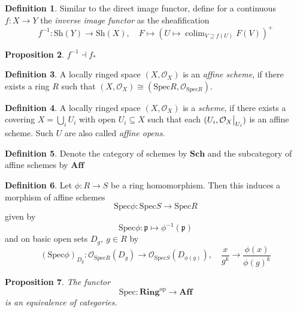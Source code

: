 \documentclass{scrartcl}
\newcommand{\p}{\mathfrak{p}}
\newcommand{\Aff}{\mathrm{\textbf{Aff}}}
\newcommand{\Sch}{\mathrm{\textbf{Sch}}}
\newcommand{\Ring}{\mathrm{\textbf{Ring}}}
\newcommand{\Spec}{\mathrm{Spec}}
\renewcommand{\O}{\mathcal{O}}
\DeclareMathOperator*{\colim}{colim}
\newcommand\restr[2]{{
    \left.\kern-\nulldelimiterspace
    #1
    \vphantom{\big|}
    \right|_{#2}
}}
\newtheorem{prop}{Proposition}[section]
\theoremstyle{definition}
\newtheorem{definition}[prop]{Definition}
\begin{document}
\begin{definition}
    Similar to the direct image functor, define for a continuous $f: X \to Y$ the \emph{inverse image functor} as the sheafification
    \begin{equation*}
        f^{-1}: \mathrm{Sh}(Y) \to \mathrm{Sh}(X), \quad F \mapsto \left( U \mapsto \colim_{V \supseteq f(U)} F(V) \right)^+
    \end{equation*}
\end{definition}
\begin{prop}
    $f^{-1} \dashv f_*$
\end{prop}
\begin{definition}
    A locally ringed space $(X, \O_X)$ is an \emph{affine scheme}, if there exists a ring $R$ such that $(X, \O_X) \cong (\Spec R, \O_{\Spec R})$.
\end{definition}
\begin{definition}
    A locally ringed space $(X, \O_X)$ is a \emph{scheme}, if there exists a covering $X = \bigcup_i U_i$ with open $U_i \subseteq X$ such that each $(U_i, \restr{\O_X}{U_i})$ is an affine scheme.
    Such $U$ are also called \emph{affine opens}.
\end{definition}
\begin{definition}
    Denote the category of schemes by $\Sch$ and the subcategory of affine schemes by $\Aff$
\end{definition}
\begin{definition}
    Let $\phi: R \to S$ be a ring homomorphism.
    Then this induces a morphism of affine schemes
    \begin{equation*}
        \Spec\phi: \Spec S \to \Spec R
    \end{equation*}
    given by
    \begin{equation*}
        \Spec\phi: \p \mapsto \phi^{-1}(\p)
    \end{equation*}
    and on basic open sets $D_g, \ g \in R$ by
    \begin{equation*}
        (\Spec\phi)_{D_g}: \O_{\Spec R}(D_g) \to \O_{\Spec S}(D_{\phi(g)}), \quad \frac x {g^k} \to \frac {\phi(x)} {\phi(g)^k}
    \end{equation*}
\end{definition}
\begin{prop}
    The functor
    \begin{equation*}
        \Spec: \Ring^{\mathrm{op}} \to \Aff
    \end{equation*}
    is an equivalence of categories.
\end{prop}
\end{document}
